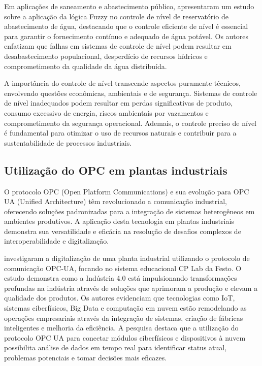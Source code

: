Em aplicações de saneamento e abastecimento público, \cite{silveira2021} apresentaram um estudo sobre a aplicação da lógica Fuzzy no controle de nível de reservatório de abastecimento de água, destacando que o controle eficiente de nível é essencial para garantir o fornecimento contínuo e adequado de água potável. Os autores enfatizam que falhas em sistemas de controle de nível podem resultar em desabastecimento populacional, desperdício de recursos hídricos e comprometimento da qualidade da água distribuída.

A importância do controle de nível transcende aspectos puramente técnicos, envolvendo questões econômicas, ambientais e de segurança. Sistemas de controle de nível inadequados podem resultar em perdas significativas de produto, consumo excessivo de energia, riscos ambientais por vazamentos e comprometimento da segurança operacional. Ademais, o controle preciso de nível é fundamental para otimizar o uso de recursos naturais e contribuir para a sustentabilidade de processos industriais.

\subsection{Utilização do OPC em plantas industriais}
\label{sec:utilizacaoopc}
O protocolo OPC (Open Platform Communications) e sua evolução para OPC UA (Unified Architecture) têm revolucionado a comunicação industrial, oferecendo soluções padronizadas para a integração de sistemas heterogêneos em ambientes produtivos. A aplicação desta tecnologia em plantas industriais demonstra sua versatilidade e eficácia na resolução de desafios complexos de interoperabilidade e digitalização.

\cite{carvalho2023} investigaram a digitalização de uma planta industrial utilizando o protocolo de comunicação OPC-UA, focando no sistema educacional CP Lab da Festo. O estudo demonstra como a Indústria 4.0 está impulsionando transformações profundas na indústria através de soluções que aprimoram a produção e elevam a qualidade dos produtos. Os autores evidenciam que tecnologias como IoT, sistemas ciberfísicos, Big Data e computação em nuvem estão remodelando as operações empresariais através da integração de sistemas, criação de fábricas inteligentes e melhoria da eficiência. A pesquisa destaca que a utilização do protocolo OPC UA para conectar módulos ciberfísicos e dispositivos à nuvem possibilita análise de dados em tempo real para identificar status atual, problemas potenciais e tomar decisões mais eficazes.

